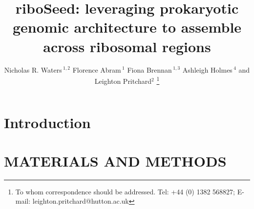 \documentclass[a4,center,fleqn]{NAR}
\begin{document}
\title{riboSeed: leveraging prokaryotic genomic architecture to assemble across ribosomal regions}

\author{%
  Nicholas R. Waters\,$^{1,2}$
  Florence Abram\,$^{1}$
  Fiona Brennan\,$^{1,3}$
  Ashleigh Holmes\,$^{4}$
  and Leighton Pritchard$^{2}$
  \footnote{To whom correspondence should be addressed.
      Tel: +44 (0) 1382 568827; E-mail: leighton.pritchard@hutton.ac.uk
  }
}
\address{
  $^{1}$Department of Microbiology, School of Natural Sciences, National University of Ireland, Galway, Ireland \\
  $^{2}$Information and Computational Sciences, James Hutton Institute, Invergowrie, Dundee DD2 5DA, Scotland\\
  $^{3}$Soil and Environmental Microbiology, Environmental Research Centre, Teagasc, Johnstown Castle, Wexford, Ireland\\
  $^{4}$Cell and Molecular Sciences, James Hutton Institute, Invergowrie, Dundee DD2 5DA, Scotland\\
}


\maketitle

\begin{abstract}
  
\end{abstract}

\section{Introduction}



\enlargethispage{-65.1pt}





\section{MATERIALS AND METHODS}




\end{document}
